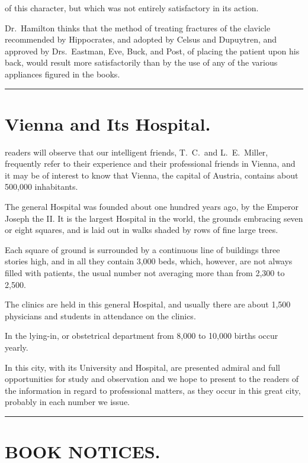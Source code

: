 of this character, but which was not entirely satisfactory in its
action.

Dr.~Hamilton thinks that the method of treating fractures of the clavicle
recommended by Hippocrates, and adopted by Celsus and Dupuytren,
and approved by Drs.~Eastman, Eve, Buck, and Post, of placing the
patient upon his back, would result more satisfactorily than by the use
of any of the various appliances figured in the books.

\fancybreak{*}

\section*{Vienna and Its Hospital.}

 readers will observe that our intelligent friends,  T.~C.\ and
L.~E.\ Miller, frequently refer to their experience and their professional
friends in Vienna, and it may be of interest to know that Vienna, the
capital of Austria, contains about 500,000 inhabitants.

The general Hospital was founded about one hundred years ago, by
the Emperor Joseph the II. It is the largest Hospital in the world,
the grounds embracing seven or eight squares, and is laid out in walks
shaded by rows of fine large trees.

Each square of ground is surrounded by a continuous line of buildings
three stories high, and in all they contain 3,000 beds, which, however,
are not always filled with patients, the usual number not averaging
more than from 2,300 to 2,500.

The clinics are held in this general Hospital, and usually there are
about 1,500 physicians and students in attendance on the clinics.

In the lying-in, or obstetrical department from 8,000 to 10,000 births
occur yearly.

In this city, with its University and Hospital, are presented admiral
and full opportunities for study and observation and we hope to present
to the readers of the  information in regard to
professional matters, as they occur in this great city, probably in each
number we issue.

\fancybreak{*}

\section*{BOOK NOTICES.}

